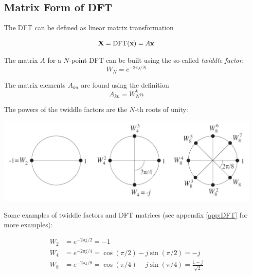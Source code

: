 \subsection{Matrix Form of DFT}
The DFT can be defined as linear matrix transformation

\begin{equation*}
	\mathbf{X} = \operatorname{\text{DFT}}(\mathbf{x}) = A \mathbf{x}
\end{equation*}

The matrix $A$ for a $N$-point DFT can be built using the so-called
\emph{twiddle factor}.
\begin{equation*}
	W_N = e^{-2 \pi j / N}
\end{equation*}

The matrix elements $A_{kn}$ are found using the definition
\begin{equation*}
	A_{kn} = W_N^kn
\end{equation*}

The powers of the twiddle factors are the $N$-th roots of unity:
\begin{center}
	\includegraphics[width=0.9\linewidth]{images/DFT_FFT_WN.jpg}
\end{center}

Some examples of twiddle factors and DFT matrices (see appendix
\ref{app:DFT} for more examples):

\begin{align*}
	W_2 &= e^{-2\pi j / 2} = -1 \\
	W_4 &= e^{-2\pi j / 4} = \cos(\pi/2) - j\sin(\pi/2) = -j \\ 
	W_8 &= e^{-2\pi j / 8} = \cos(\pi/4) - j\sin(\pi/4) = \frac{1-j}{\sqrt{2}}
\end{align*}


